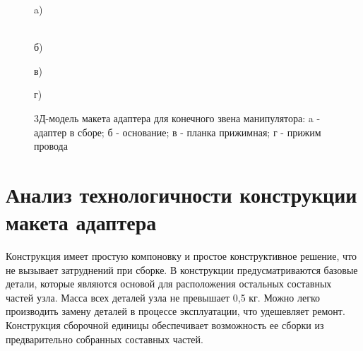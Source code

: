 \begin{figure}[H]
\begin{minipage}[h]{0.47\linewidth}
 a) \\
\end{minipage}
\hfill
\begin{minipage}[h]{0.47\linewidth}
 \\б)
\end{minipage}
\vfill
\begin{minipage}[h]{0.47\linewidth}
 в) \\
\end{minipage}
\hfill
\begin{minipage}[h]{0.47\linewidth}
 г) \\
\end{minipage}
\caption{3Д-модель макета адаптера для конечного звена манипулятора: a - адаптер в сборе; б - основание; в - планка прижимная; г - прижим провода}
\label{ris:experimentalcorrelationsignals}
\end{figure}









\section{Анализ технологичности конструкции макета адаптера}
Конструкция имеет простую компоновку и простое конструктивное решение, что не вызывает затруднений при сборке. В конструкции предусматриваются базовые детали, которые являются основой для расположения остальных составных частей узла. Масса всех деталей узла не превышает 0,5 кг. Можно легко производить замену деталей в процессе эксплуатации, что удешевляет ремонт. Конструкция сборочной единицы  обеспечивает возможность ее сборки из предварительно собранных составных частей.


